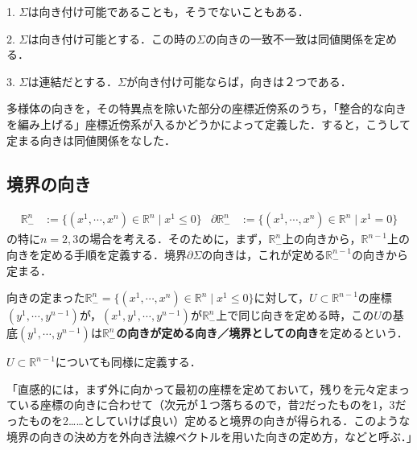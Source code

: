 \documentclass[uplatex, dvipdfmx]{jsreport}
\begin{document}
\begin{theorem}
    1. $\Sigma$は向き付け可能であることも，そうでないこともある．

    2. $\Sigma$は向き付け可能とする．この時の$\Sigma$の向きの一致不一致は同値関係を定める．

    3. $\Sigma$は連結だとする．$\Sigma$が向き付け可能ならば，向きは２つである．
\end{theorem}

\begin{screen}
    多様体の向きを，その特異点を除いた部分の座標近傍系のうち，「整合的な向きを編み上げる」座標近傍系が入るかどうかによって定義した．すると，こうして定まる向きは同値関係をなした．
\end{screen}

\subsection{境界の向き}

\begin{align*}
    \mathbb{R}^n_-&:=\{(x^1,\cdots,x^n)\in\mathbb{R}^n\mid x^1\le 0\} & \partial\mathbb{R}^n_-&:=\{(x^1,\cdots,x^n)\in\mathbb{R}^n\mid x^1= 0\}
\end{align*}
の特に$n=2,3$の場合を考える．そのために，まず，$\mathbb{R}^n_-$上の向きから，$\mathbb{R}^{n-1}$上の向きを定める手順を定義する．境界$\partial\Sigma$の向きは，これが定める$\mathbb{R}^{n-1}_-$の向きから定まる．

\begin{definition}
    向きの定まった$\mathbb{R}^n_-=\{(x^1,\cdots,x^n)\in\mathbb{R}^n\mid x^1\le 0\}$に対して，$U\subset\mathbb{R}^{n-1}$の座標$(y^1,\cdots,y^{n-1})$が，$(x^1,y^1,\cdots,y^{n-1})$が$\mathbb{R}^n_-$上で同じ向きを定める時，この$U$の基底$(y^1,\cdots,y^{n-1})$は\textbf{$\mathbb{R}^n_-$の向きが定める向き／境界としての向き}を定めるという．

    $U\subset\mathbb{R}^{n-1}$についても同様に定義する．
\end{definition}
\begin{remark*}
    「直感的には，まず外に向かって最初の座標を定めておいて，残りを元々定まっている座標の向きに合わせて（次元が１つ落ちるので，昔2だったものを1，3だったものを2……としていけば良い）定めると境界の向きが得られる．このような境界の向きの決め方を外向き法線ベクトルを用いた向きの定め方，などと呼ぶ．」
\end{remark*}
\end{document}
